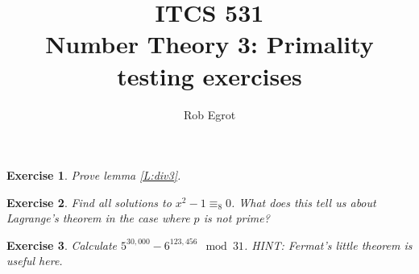 \documentclass{article}
\title{ITCS 531 \\Number Theory 3: Primality testing exercises}
\author{Rob Egrot}
\date{}
\theoremstyle{plain}
\newtheorem{Q}{Exercise}{\bfseries}{\upshape}
\newcommand{\HCF}{\mathbf{HCF}}
\begin{document}
\maketitle

\begin{Q}\label{\prefix Q:div}
Prove lemma \ref{L:div3}.
\end{Q}
\begin{comment}
\textbf{Solution:}
Suppose $a|bc$ and $a$ and $b$ are coprime. Since $a|bc$ we know there is $k$ with $ak = bc$. Also, as $a$ and $b$ are coprime, $\HCF(a,b) = 1$, so by corollary 1.10 (B\'ezout's identity) there are $x$ and $y$ with $xa + by = 1$. This means $xac + byc = c$, which means $xac +yak = c$. Rearranging gives $a(xc +yk) = c$, and so $a|c$.

Another way to prove this is to notice that no prime factor of $a$ can divide $b$ (as $a$ and $b$ are coprime). Also, by lemma 1.11 every prime factor of $a$ must divide either $b$ or $c$. Putting this together means every prime factor of $a$ divides $c$, and so $a|c$. 
\end{comment}

\begin{Q}
Find all solutions to $x^2- 1 \equiv_{8} 0$. What does this tell us about Lagrange's theorem in the case where $p$ is not prime?
\end{Q}
\begin{comment}
\textbf{Solution:}
The solutions are $1,3,5,7$. This tells us that Lagrange's theorem is false when $p$ is not prime.
\end{comment}

\begin{Q}
Calculate $5^{30,000} - 6^{123,456}\mod 31$. HINT: Fermat's little theorem is useful here. 
\end{Q}
\begin{comment}
\textbf{Solution:}
We have $5^{30000} = 5^{30(1000)}$, and $5^{30} \equiv_{31} 1$ by Fermat's little theorem. So $5^{30000}\equiv_{31} 1^{1000} \equiv_{31} 1$. Also, $123456= 30(4115)+6$, so 
\begin{align*}
6^{123456} &= 6^{30(4115)+6}\\
&= 6^{30(4115)}.6^6 \\
&\equiv_{31} 1^{4115}.6^6 \text{ using Fermat's little theorem}\\
&\equiv_{31} 6^2.6^2.6^2\\
&\equiv_{31} 5.5.5\\
&\equiv_{31} 125 \\
&\equiv_{31} 1.
\end{align*} 
So $5^{30,000} - 6^{123,456} = 0\mod 31$.
\end{comment}
\end{document}
